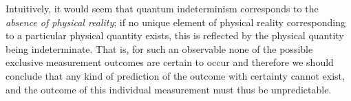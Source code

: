 \documentclass[%
 superscriptaddress,
 preprint,
 showpacs,
 showkeys,
 preprintnumbers,
  amsmath,amssymb,
  aps,
 pra,
  longbibliography,
  floatfix,
 ]{revtex4-1}
\theoremstyle{definition}
\begin{document}
Intuitively, it would seem that quantum indeterminism corresponds to the {\em absence of physical reality};
if no unique element of physical reality corresponding to a particular physical quantity exists, this is reflected by the physical quantity being indeterminate.
That is, for such an observable none of the possible exclusive measurement outcomes are certain to occur and therefore we should conclude that any kind of prediction of the outcome with certainty cannot exist, and the outcome of this individual measurement must thus be unpredictable.


\end{document}
